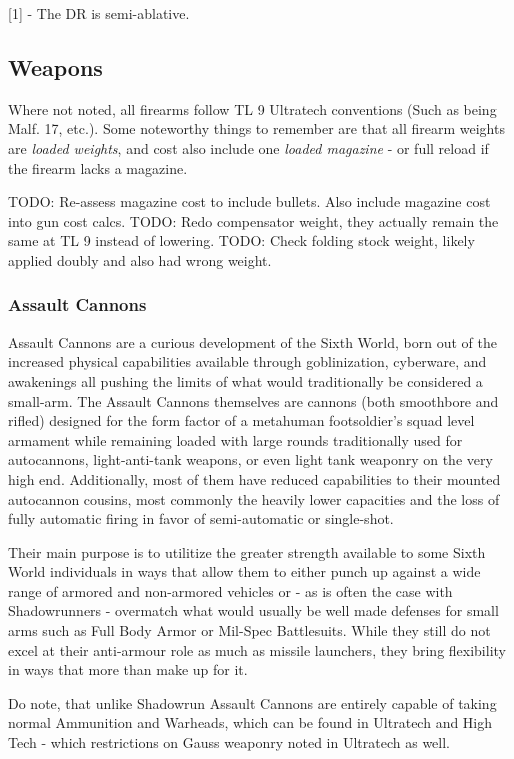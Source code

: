 [1] - The DR is semi-ablative.

\subsection{Weapons}

Where not noted, all firearms follow TL 9 Ultratech conventions (Such as being Malf. 17, etc.). Some noteworthy things to remember are that all firearm weights are \textit{loaded weights}, and cost also include one \textit{loaded magazine} - or full reload if the firearm lacks a magazine.

TODO: Re-assess magazine cost to include bullets. Also include magazine cost into gun cost calcs.
TODO: Redo compensator weight, they actually remain the same at TL 9 instead of lowering.
TODO: Check folding stock weight, likely applied doubly and also had wrong weight.

\subsubsection{Assault Cannons}

Assault Cannons are a curious development of the Sixth World, born out of the increased physical capabilities available through goblinization, cyberware, and awakenings all pushing the limits of what would traditionally be considered a small-arm. The Assault Cannons themselves are cannons (both smoothbore and rifled) designed for the form factor of a metahuman footsoldier's squad level armament while remaining loaded with large rounds traditionally used for autocannons, light-anti-tank weapons, or even light tank weaponry on the very high end. Additionally, most of them have reduced capabilities to their mounted autocannon cousins, most commonly the heavily lower capacities and the loss of fully automatic firing in favor of semi-automatic or single-shot.

Their main purpose is to utilitize the greater strength available to some Sixth World individuals in ways that allow them to either punch up against a wide range of armored and non-armored vehicles or - as is often the case with Shadowrunners - overmatch what would usually be well made defenses for small arms such as Full Body Armor or Mil-Spec Battlesuits. While they still do not excel at their anti-armour role as much as missile launchers, they bring flexibility in ways that more than make up for it.

Do note, that unlike Shadowrun Assault Cannons are entirely capable of taking normal Ammunition and Warheads, which can be found in Ultratech and High Tech - which restrictions on Gauss weaponry noted in Ultratech as well.

